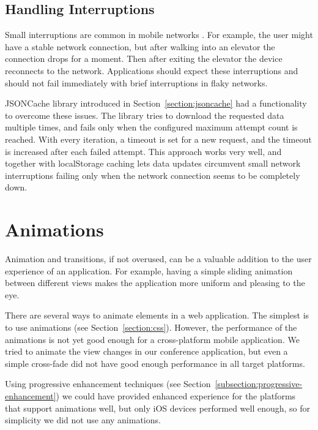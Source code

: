 
\subsection{Handling Interruptions}

Small interruptions are common in mobile networks \citationneeded. For
example, the user might have a stable network connection, but after
walking into an elevator the connection drops for a moment. Then after
exiting the elevator the device reconnects to the
network. Applications should expect these interruptions and should not
fail immediately with brief interruptions in flaky networks.

JSONCache library introduced in Section~\ref{section:jsoncache} had a
functionality to overcome these issues. The library tries to download
the requested data multiple times, and fails only when the configured
maximum attempt count is reached. With every iteration, a timeout is
set for a new request, and the timeout is increased after each failed
attempt. This approach works very well, and together with localStorage
caching lets data updates circumvent small network interruptions
failing only when the network connection seems to be completely down.

\section{Animations}
\label{section:animations}

Animation and transitions, if not overused, can be a valuable addition
to the user experience of an application. For example, having a simple
sliding animation between different views makes the application more
uniform and pleasing to the eye.

There are several ways to animate elements in a web application. The
simplest is to use  animations (see
Section~\ref{section:css}). However, the performance of the animations
is not yet good enough for a cross-platform mobile application. We
tried to animate the view changes in our conference application, but
even a simple cross-fade did not have good enough performance in all
target platforms.

Using progressive enhancement techniques (see
Section~\ref{subsection:progressive-enhancement}) we could have
provided enhanced experience for the platforms that support animations
well, but only iOS devices performed well enough, so for simplicity we
did not use any animations.

